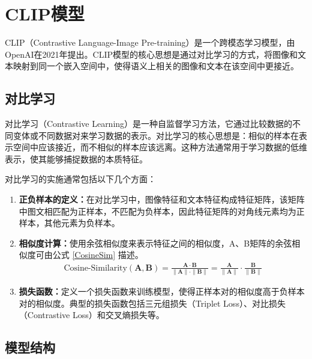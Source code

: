 \documentclass[a4paper]{zreport}
\begin{document}
\section{CLIP模型}

CLIP（Contrastive Language-Image Pre-training）是一个跨模态学习模型\cite{clip}，由OpenAI在2021年提出。CLIP模型的核心思想是通过对比学习的方式，将图像和文本映射到同一个嵌入空间中，使得语义上相关的图像和文本在该空间中更接近。

\subsection{对比学习}

对比学习（Contrastive Learning）是一种自监督学习方法\cite{liu2021self}，它通过比较数据的不同变体或不同数据对来学习数据的表示。对比学习的核心思想是：相似的样本在表示空间中应该接近，而不相似的样本应该远离。这种方法通常用于学习数据的低维表示，使其能够捕捉数据的本质特征。

对比学习的实施通常包括以下几个方面：
\begin{enumerate}
\item \textbf{正负样本的定义：}在对比学习中，图像特征和文本特征构成特征矩阵，该矩阵中图文相匹配为正样本，不匹配为负样本，因此特征矩阵的对角线元素均为正样本，其他元素为负样本。
\item \textbf{相似度计算：}使用余弦相似度来表示特征之间的相似度，A、B矩阵的余弦相似度可由公式 \eqref{CosineSim} 描述。
\begin{gather}
\text{Cosine-Similarity}(\mathbf{A}, \mathbf{B})
= {\frac{\mathbf{A} \cdot \mathbf{B}} {\| \mathbf{A} \| \cdot \| \mathbf{B} \|}}
= \frac{\mathbf{A}}{\| \mathbf{A} \|} \cdot \frac{\mathbf{B}}{\| \mathbf{B} \|}
\label{CosineSim}
\end{gather}
\item \textbf{损失函数：}定义一个损失函数来训练模型，使得正样本对的相似度高于负样本对的相似度。典型的损失函数包括三元组损失（Triplet Loss）、对比损失（Contrastive Loss）和交叉熵损失等。
\end{enumerate}

\subsection{模型结构}
\end{document}
